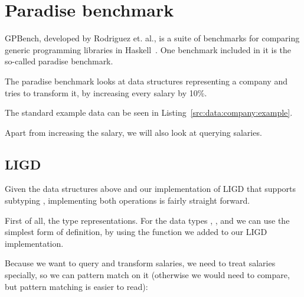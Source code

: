 \section{Paradise benchmark}
GPBench, developed by Rodriguez et. al., is a suite of benchmarks for comparing
generic programming libraries in Haskell~\cite{DBLP:conf/haskell/RodriguezJJGKO08}.
One benchmark included in it is the so-called paradise benchmark.

The paradise benchmark looks at data structures representing a company
and tries to transform it, by increasing every salary by 10\%.{}



The standard example data can be seen in Listing~\ref{src:data:company:example}.



Apart from increasing the salary, we will also look at querying salaries.


\subsection{LIGD}

Given the data structures above and our implementation of LIGD that supports
subtyping , implementing both operations is fairly straight forward.

First of all, the type representations. For the data types ,
, and we can use the simplest form of definition,
by using the  function we added to our LIGD implementation.




Because we want to query and transform salaries, we need to treat salaries
specially, so we can pattern match on it (otherwise we would need to compare,
but pattern matching is easier to read):



